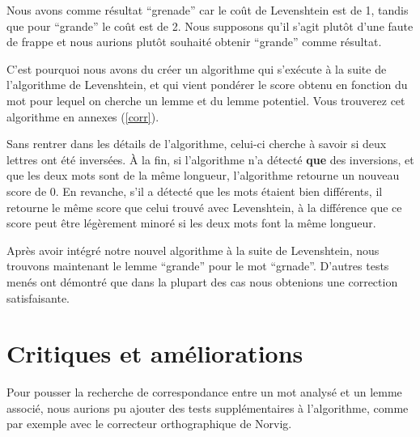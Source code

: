Nous avons comme résultat ``grenade'' car le coût de Levenshtein est de 1, tandis que pour ``grande'' le coût est de 2. Nous supposons qu'il s'agit plutôt d'une faute de frappe et nous aurions plutôt souhaité obtenir ``grande'' comme résultat.

\medskip

C'est pourquoi nous avons du créer un algorithme qui s'exécute à la suite de l'algorithme de Levenshtein, et qui vient pondérer le score obtenu en fonction du mot pour lequel on cherche un lemme et du lemme potentiel. Vous trouverez cet algorithme en annexes (\ref{corr}).

\medskip

Sans rentrer dans les détails de l'algorithme, celui-ci cherche à savoir si deux lettres ont été inversées. À la fin, si l'algorithme n'a détecté \textbf{que} des inversions, et que les deux mots sont de la même longueur, l'algorithme retourne un nouveau score de 0. En revanche, s'il a détecté que les mots étaient bien différents, il retourne le même score que celui trouvé avec Levenshtein, à la différence que ce score peut être légèrement minoré si les deux mots font la même longueur.

\medskip

Après avoir intégré notre nouvel algorithme à la suite de Levenshtein, nous trouvons maintenant le lemme ``grande'' pour le mot ``grnade''. D'autres tests menés ont démontré que dans la plupart des cas nous obtenions une correction satisfaisante.

\section{Critiques et améliorations}

Pour pousser la recherche de correspondance entre un mot analysé et un lemme associé, nous aurions pu ajouter des tests supplémentaires à l'algorithme, comme par exemple avec le correcteur orthographique de Norvig.
